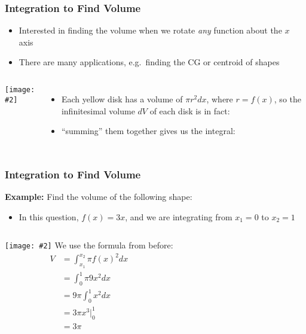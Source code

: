 \documentclass[12pt,compress,aspectratio=169]{beamer}
\newcommand{\pic}[2]{\texttt{[image: \#2]}}
\begin{document}
\begin{frame}
  \frametitle{Integration to Find Volume}
  \begin{itemize}
  \item Interested in finding the volume when we rotate \emph{any} function
    about the $x$ axis
  \item There are many applications, e.g.\ finding the CG or centroid of shapes
  \end{itemize}
  \begin{columns}
    \pic{1}{cone.png}
    \begin{itemize}
    \item Each yellow disk has a volume of $\pi r^2dx$,
      where $r=f(x)$, so the infinitesimal volume $dV$ of each disk is in fact:
      
    \item ``summing'' them together gives us the integral:
      
    \end{itemize}
  \end{columns}
\end{frame}



\begin{frame}
  \frametitle{Integration to Find Volume}
  \textbf{Example:} Find the volume of the following shape:
  \begin{itemize}
  \item In this question, $f(x)=3x$, and we are integrating from $x_1=0$ to
    $x_2=1$
  \end{itemize}
  \vspace{.1in}
  \begin{columns}
    \pic{1}{cone.png}
    We use the formula from before:
    \begin{align*}
      V&=\int_{x_1}^{x_2} \pi f(x)^{2} dx\\
      &=\int_{0}^{1} \pi 9x^2dx\\
      &=9\pi\int_{0}^{1} x^2dx\\
      &=3\pi x^3\Big|^1_0\\
      &=3\pi
    \end{align*}
  \end{columns}
\end{frame}
\end{document}
